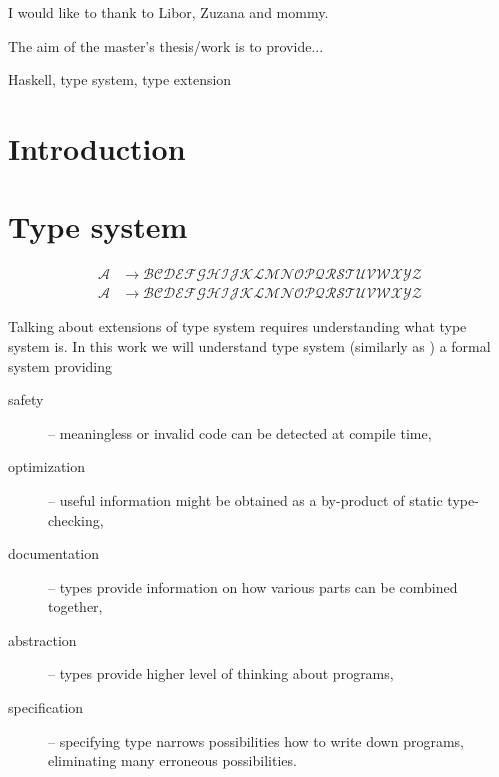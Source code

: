 \documentclass[11pt,oneside,draft]{fithesis2}
\begin{document}
\FrontMatter
\ThesisTitlePage

\begin{ThesisDeclaration}
\DeclarationText
\AdvisorName
\end{ThesisDeclaration}

\begin{ThesisThanks}
I would like to thank to Libor, Zuzana and mommy.
\end{ThesisThanks}

\begin{ThesisAbstract}
The aim of the master's thesis/work is to provide...
\end{ThesisAbstract}

\begin{ThesisKeyWords}
Haskell, type system, type extension
\end{ThesisKeyWords}

\tableofcontents
\listoffigures

\MainMatter

\chapter{Introduction}

\chapter{Type system}

\begin{align*}
	\mathscr{A} & \to \mathscr{BCDEFGHIJKLMNOPQRSTUVWXYZ} \\
	\mathcal{A} & \to \mathcal{BCDEFGHIJKLMNOPQRSTUVWXYZ}
\end{align*}

Talking about extensions of type system requires understanding what type system is.
In this work we will understand type system (similarly as
\cite{pierce:2002:types,barendregt:1992:lambdaProc}) a formal system providing

\begin{description}
	\item[safety] -- meaningless or invalid code can be detected at compile time,
	\item[optimization] -- useful information might be obtained as a by-product of static type-checking,
	\item[documentation] -- types provide information on how various parts can be combined together,
	\item[abstraction] -- types provide higher level of thinking about programs,
	\item[specification] -- specifying type narrows possibilities how to write down programs,
		eliminating many erroneous possibilities.
\end{description}
\end{document}
